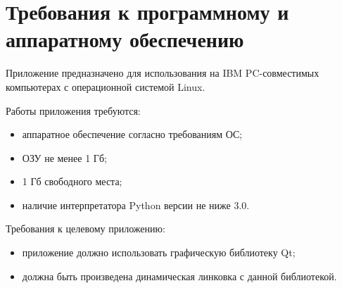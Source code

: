\section{Требования к программному и аппаратному обеспечению}

Приложение предназначено для использования на IBM PC-совместимых компьютерах с
операционной системой Linux.

Работы приложения требуются:

\begin{itemize}
	\item аппаратное обеспечение согласно требованиям ОС;
	\item ОЗУ не менее 1 Гб;
	\item 1 Гб свободного места;
	\item наличие интерпретатора Python версии не ниже 3.0.
\end{itemize}

Требования к целевому приложению:

\begin{itemize}
	\item приложение должно использовать графическую библиотеку Qt;
	\item должна быть произведена динамическая линковка с данной библиотекой.
\end{itemize}

